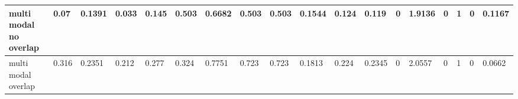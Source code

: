 \begin{landscape}
\begin{table}[tbp]
\begin{tabular}{|l|l|l|l|l|l|l|l|l|l|l|l|l|l|l|l|l|l|}
        multi modal no overlap & 0.07 & 0.1391 & 0.033 & 0.145 & 0.503 & 0.6682 & 0.503 & 0.503 & 0.1544 & 0.124 & 0.119 & 0 & 1.9136 & 0 & 1 & 0 & 0.1167 \\ \hline
        multi modal overlap & 0.316 & 0.2351 & 0.212 & 0.277 & 0.324 & 0.7751 & 0.723 & 0.723 & 0.1813 & 0.224 & 0.2345 & 0 & 2.0557 & 0 & 1 & 0 & 0.0662 \\ \hline
    \end{tabular}
    \label{table:imb_complexity}
\end{table}
\end{landscape}